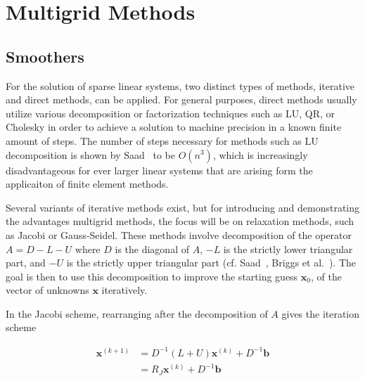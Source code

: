 
\chapter{Multigrid Methods}
\label{chapter:MultigridMethods}

\section{Smoothers}



For the solution of sparse linear systems, two distinct types of methods, iterative and direct methods, can be applied. For general purposes, direct methods usually utilize various decomposition or factorization techniques such as LU, QR, or Cholesky in order to achieve a solution to machine precision in a known finite amount of steps. The number of steps necessary for methods such as LU decomposition is shown by Saad~\cite{Saad2003} to be $O(n^3)$, which is increasingly disadvantageous for ever larger linear systems that are arising form the applicaiton of finite element methods.

Several variants of iterative methods exist, but for introducing and demonstrating the advantages multigrid methods, the focus will be on relaxation methods, such as Jacobi or Gauss-Seidel. These methods involve decomposition of the operator $A = D - L - U$ where $D$ is the diagonal of $A$, $-L$ is the strictly lower triangular part, and $-U$ is the strictly upper triangular part (cf. Saad~\cite{Saad2003}, Briggs et al.~\cite{Briggs2000}). The goal is then to use this decomposition to improve the starting guess $\mathbf{x}_{0}$, of the vector of unknowns $\mathbf{x}$ iteratively.

In the Jacobi scheme, rearranging after the decomposition of $A$ gives the iteration scheme

\begin{equation}
	\begin{aligned}
	\mathbf{x}^{(k+1)} &= D^{-1}(L + U)\mathbf{x}^{(k)} + D^{-1}\mathbf{b} \\
	                   &= R_J\mathbf{x}^{(k)} + D^{-1} \mathbf{b}
	\end{aligned}
\end{equation}

